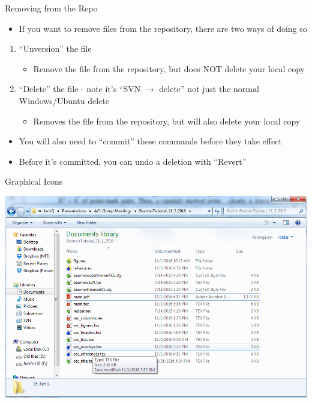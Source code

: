 \documentclass[11pt,mathserif]{beamer} %
\begin{document}
\begin{frame}[t]{Removing from the Repo}
	\begin{itemize} 
		\item If you want to remove files from the repository, there are two ways of doing so
	\end{itemize}
	\begin{enumerate}
		\item ``Unversion'' the file
		\begin{itemize}
			\item Remove the file from the repository, but does NOT delete your local copy
		\end{itemize}
\vspace{0.1in}
		\item ``Delete'' the file - note it's ``SVN $\longrightarrow$ delete'' not just the normal Windows/Ubuntu delete
		\begin{itemize}
			\item Removes the file from the repository, but will also delete your local copy
		\end{itemize}
	\end{enumerate}
	\begin{itemize}
		\item You will also need to ``commit'' these commands before they take effect
		\item Before it's committed, you can undo a deletion with ``Revert''
	\end{itemize}
\end{frame}


\begin{frame}[t]{Graphical Icons}
	\begin{center}
		\includegraphics[width=0.95\columnwidth]{figures/folderView.png}
	\end{center}
\end{frame}
\end{document}
